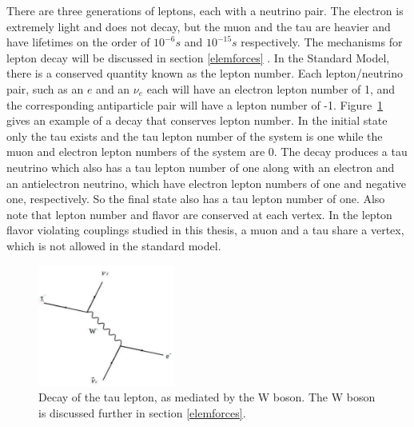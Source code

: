 \documentclass[oneside, letterpaper, oldfontcommands]{memoir}
\begin{document}

\qquad There are three generations of leptons, each with a neutrino pair. The electron is extremely light and does not decay, but the muon and the tau are heavier and have lifetimes on the order of $10^{-6}s$ and $10^{-15}s$ respectively\cite{Agashe:2014kda}. The mechanisms for lepton decay will be discussed in section \ref{elemforces} . In the Standard Model, there is a conserved quantity known as the lepton number. Each lepton/neutrino pair, such as an $e$ and an $\nu_{e}$ each will have an electron lepton number of 1, and the corresponding antiparticle pair will have a lepton number of -1. Figure~\ref{fig:TauDecay} gives an example of a decay that conserves lepton number. In the initial state only the tau exists and the tau lepton number of the system is one while the muon and electron lepton numbers of the system are 0. The decay produces a tau neutrino which also has a tau lepton number of one along with an electron and an antielectron neutrino, which have electron lepton numbers of one and negative one, respectively. So the final state also has a tau lepton number of one. Also note that lepton number and flavor are conserved at each vertex. In the lepton flavor violating couplings studied in this thesis, a muon and a tau share a vertex, which is not allowed in the standard model. 

\begin{figure}[here]
\includegraphics[width=0.4\textwidth]{TauDecay.pdf}
\caption{Decay of the tau lepton, as mediated by the W boson. The W boson is discussed further in section \ref{elemforces}.}
\label{fig:TauDecay}
\end{figure}
\end{document}
